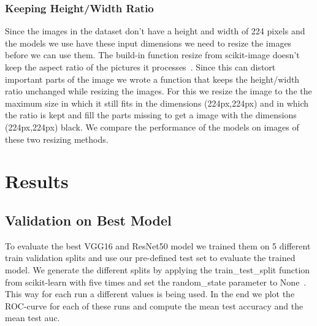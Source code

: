 \documentclass[sn-mathphys,Numbered]{sn-jnl}%
\theoremstyle{thmstyleone}%
\theoremstyle{thmstyletwo}%
\theoremstyle{thmstylethree}%
\begin{document}
\subsubsection{Keeping Height/Width Ratio}
\label{HeightWidth}
Since the images in the dataset don't have a height and width of 224 pixels and the models we use have these input dimensions we need to resize the images before we can use them. The build-in function resize from scikit-image doesn't keep the aspect ratio of the pictures it processes~\cite{resize}. Since this can distort important parts of the image we wrote a function that keeps the height/width ratio unchanged while resizing the images. For this we resize the image to the the maximum size in which it still fits in the dimensions (224px,224px) and in which the ratio is kept and fill the parts missing to get a image with the dimensions (224px,224px) black. We compare the performance of the models on images of these two resizing methods.\\
\section{Results}
\label{Results}
\subsection{Validation on Best Model}
\label{CV_Results}
To evaluate the best VGG16 and ResNet50 model we trained them on 5 different train validation splits and use our pre-defined test set to evaluate the trained model. We generate the different splits by applying the train\_test\_split function from scikit-learn with five times and set the random\_state parameter to None~\cite{TTS}. This way for each run a different values is being used. In the end we plot the ROC-curve for each of these runs and compute the mean test accuracy and the mean test auc.
\end{document}

